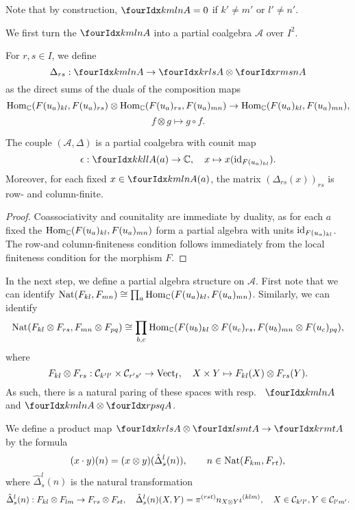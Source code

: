 Note that by construction, $\Gr{A}{k}{l}{m}{n}=0$ if $k'\neq m'$ or $l'\neq n'$. 

We first turn the $\Gr{A}{k}{l}{m}{n}$ into a partial coalgebra $\mathscr{A}$ over $I^2$.

\begin{Def} For $r,s\in I$, we define \[\Delta_{rs}: \Gr{A}{k}{l}{m}{n}\rightarrow \Gr{A}{k}{l}{r}{s}\otimes \Gr{A}{r}{s}{m}{n}\] as the direct sums of the duals of the composition maps \[\operatorname{Hom}_{\mathbb{C}}(F(u_a)_{kl},F(u_a)_{rs}) \otimes \operatorname{Hom}_{\mathbb{C}}(F(u_a)_{rs},F(u_a)_{mn})\rightarrow \operatorname{Hom}_{\mathbb{C}}(F(u_a)_{kl},F(u_a)_{mn}),\]\[f\otimes g \mapsto g\circ f.\]
\end{Def} 

\begin{Lem} The couple $(\mathscr{A},\Delta)$ is a partial coalgebra with counit map \[\epsilon:\Gr{A(a)}{k}{l}{k}{l}\rightarrow \C,\quad x\mapsto x(\id_{\Forget(u_a)_{kl}}).\] Moreover, for each fixed $x\in \Gr{A(a)}{k}{l}{m}{n}$, the matrix $\left(\Delta_{rs}(x)\right)_{rs}$ is row- and column-finite.
\end{Lem} 
\begin{proof} Coassociativity and counitality are immediate by duality, as for each $a$ fixed the $\operatorname{Hom}_{\mathbb{C}}(F(u_a)_{kl},F(u_a)_{mn})$ form a partial algebra with units $\operatorname{id}_{F(u_a)_{kl}}$. The row-and column-finiteness condition follows immediately from the local finiteness condition for the morphism $F$.
\end{proof}

In the next step, we define a partial algebra structure on $\mathscr{A}$. %
First note that we can identify $\operatorname{\mathrm{Nat}}(F_{kl},F_{mn}) \cong \prod_a \operatorname{Hom}_{\mathbb{C}}(F(u_a)_{kl},F(u_a)_{mn})$. Similarly, we can identify \[\operatorname{\mathrm{Nat}}(F_{kl}\otimes F_{rs},F_{mn}\otimes F_{pq}) \cong  \prod_{b,c} \operatorname{Hom}_{\mathbb{C}}(F(u_b)_{kl}\otimes F(u_c)_{rs} ,F(u_b)_{mn}\otimes F(u_c)_{pq}),\] where \[F_{kl}\otimes F_{rs}:\mathcal{C}_{k'l'}\times \mathcal{C}_{r's'}\rightarrow \mathrm{Vect}_{\operatorname{\mathrm{f}}},\quad X\times Y \mapsto F_{kl}(X)\otimes F_{rs}(Y).\] As such, there is a natural paring of these spaces with resp.~ $\Gr{A}{k}{l}{m}{n}$ and $\Gr{A}{k}{l}{m}{n}\otimes \Gr{A}{r}{s}{p}{q}$. 


\begin{Def} We define a product map $\Gr{A}{k}{l}{r}{s} \otimes \Gr{A}{l}{m}{s}{t}\rightarrow  \Gr{A}{k}{m}{r}{t}$ by the formula \[(x\cdot y)(n) = (x\otimes y)( \hat{\Delta}^{l}_{s}(n)), \qquad  n \in \operatorname{\mathrm{Nat}}(F_{km},F_{rt}),\] where $\hat{\Delta}^l_s(n)$ is the natural transformation\[\hat{\Delta}^l_s(n):  F_{kl}\otimes F_{lm}\rightarrow F_{rs}\otimes F_{st},\quad \hat{\Delta}^l_s(n)(X,Y) = \pi^{(rst)}n_{X\otimes Y} \iota^{(klm)},\quad X\in \mathcal{C}_{k'l'},Y\in \mathcal{C}_{l'm'}.\]
\end{Def}

